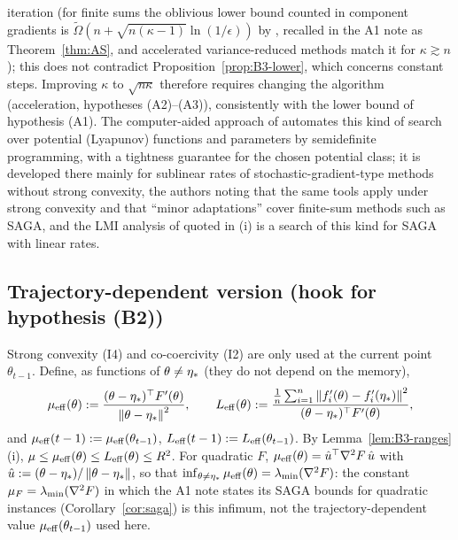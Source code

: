 \begin{remark}
iteration (for finite sums the oblivious lower bound counted in component gradients is $\tilde\Omega(n+\sqrt{n(\kappa-1)}\ln(1/\epsilon))$ by \cite[Theorem~2]{arjevani2016dimension}, recalled in the A1 note as Theorem~\ref{thm:AS}, and accelerated variance-reduced methods match it for $\kappa\gtrsim n$); this does not contradict Proposition~\ref{prop:B3-lower}, which concerns constant steps. Improving $\kappa$ to $\sqrt{n\kappa}$ therefore requires changing the algorithm (acceleration, hypotheses (A2)--(A3)), consistently with the lower bound of hypothesis (A1). The computer-aided approach of \cite{taylor2019stochastic} automates this kind of search over potential (Lyapunov) functions and parameters by semidefinite programming, with a tightness guarantee for the chosen potential class; it is developed there mainly for sublinear rates of stochastic-gradient-type methods without strong convexity, the authors noting that the same tools apply under strong convexity and that ``minor adaptations'' cover finite-sum methods such as SAGA, and the LMI analysis of \cite{hu2017unified} quoted in (i) is a search of this kind for SAGA with linear rates.
\end{remark}

\subsection{Trajectory-dependent version (hook for hypothesis (B2))}\label{sec:B3-traj}

Strong convexity (I4) and co-coercivity (I2) are only used at the current point $\theta_{t-1}$. Define, as functions of $\theta\ne\eta_\ast$ (they do not depend on the memory),
\[
\mu_{\mathrm{eff}}(\theta):=\frac{(\theta-\eta_\ast)^\top F'(\theta)}{\left\|\theta-\eta_\ast\right\|^2},\qquad
L_{\mathrm{eff}}(\theta):=\frac{\frac1n\sum_{i=1}^n\left\|f'_i(\theta)-f'_i(\eta_\ast)\right\|^2}{(\theta-\eta_\ast)^\top F'(\theta)},
\]
and $\mu_{\mathrm{eff}}(t-1):=\mu_{\mathrm{eff}}(\theta_{t-1})$, $L_{\mathrm{eff}}(t-1):=L_{\mathrm{eff}}(\theta_{t-1})$. By Lemma~\ref{lem:B3-ranges}(i), $\mu\le\mu_{\mathrm{eff}}(\theta)\le L_{\mathrm{eff}}(\theta)\le R^2$. For quadratic $F$, $\mu_{\mathrm{eff}}(\theta)=\hat u^\top\nabla^2F\,\hat u$ with $\hat u:=(\theta-\eta_\ast)/\left\|\theta-\eta_\ast\right\|$, so that $\inf_{\theta\ne\eta_\ast}\mu_{\mathrm{eff}}(\theta)=\lambda_{\min}(\nabla^2F)$: the constant $\mu_F=\lambda_{\min}(\nabla^2F)$ in which the A1 note states its SAGA bounds for quadratic instances (Corollary~\ref{cor:saga}) is this infimum, not the trajectory-dependent value $\mu_{\mathrm{eff}}(\theta_{t-1})$ used here.

